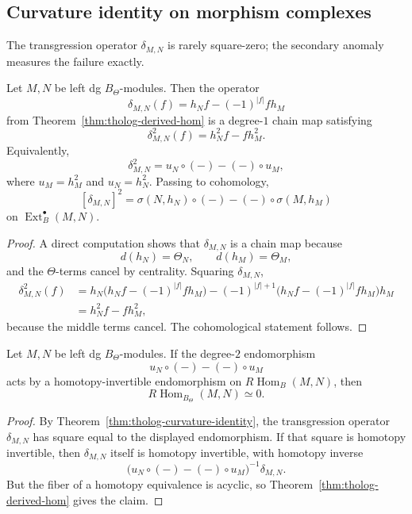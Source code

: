 \subsection{Curvature identity on morphism complexes}
\label{subsec:tholog-curvature-identity}

The transgression operator \(\delta_{M,N}\) is rarely square-zero; the secondary anomaly measures the failure exactly.

\begin{theorem}
\label{thm:tholog-curvature-identity}
Let \(M,N\) be left dg \(B_{\Theta}\)-modules.
Then the operator
\[
\delta_{M,N}(f)=h_{N}f-(-1)^{|f|}fh_{M}
\]
from Theorem~\ref{thm:tholog-derived-hom} is a degree-\(1\) chain map satisfying
\[
\delta_{M,N}^{2}(f)=h_{N}^{2}f-fh_{M}^{2}.
\]
Equivalently,
\[
\delta_{M,N}^{2}
=
u_{N}\circ(-)-(-)\circ u_{M},
\]
where \(u_{M}=h_{M}^{2}\) and \(u_{N}=h_{N}^{2}\).
Passing to cohomology,
\[
[\delta_{M,N}]^{2}
=
\sigma(N,h_{N})\circ(-)-(-)\circ \sigma(M,h_{M})
\]
on \(\operatorname{Ext}^{\bullet}_{B}(M,N)\).
\end{theorem}

\begin{proof}
A direct computation shows that \(\delta_{M,N}\) is a chain map because
\[
d(h_{N})=\Theta_{N},\qquad d(h_{M})=\Theta_{M},
\]
and the \(\Theta\)-terms cancel by centrality.
Squaring \(\delta_{M,N}\),
\begin{align*}
\delta_{M,N}^{2}(f)
&=
h_{N}\big(h_{N}f-(-1)^{|f|}fh_{M}\big)
-
(-1)^{|f|+1}\big(h_{N}f-(-1)^{|f|}fh_{M}\big)h_{M}
\\
&=
h_{N}^{2}f-fh_{M}^{2},
\end{align*}
because the middle terms cancel.
The cohomological statement follows.
\end{proof}

\begin{corollary}
\label{cor:tholog-orthogonality}
Let \(M,N\) be left dg \(B_{\Theta}\)-modules.
If the degree-\(2\) endomorphism
\[
u_{N}\circ(-)-(-)\circ u_{M}
\]
acts by a homotopy-invertible endomorphism on \(R\!\operatorname{Hom}_{B}(M,N)\), then
\[
R\!\operatorname{Hom}_{B_{\Theta}}(M,N)\simeq 0.
\]
\end{corollary}

\begin{proof}
By Theorem~\ref{thm:tholog-curvature-identity}, the transgression operator \(\delta_{M,N}\) has square equal to the displayed endomorphism.
If that square is homotopy invertible, then \(\delta_{M,N}\) itself is homotopy invertible, with homotopy inverse
\[
\big(u_{N}\circ(-)-(-)\circ u_{M}\big)^{-1}\delta_{M,N}.
\]
But the fiber of a homotopy equivalence is acyclic, so Theorem~\ref{thm:tholog-derived-hom} gives the claim.
\end{proof}

